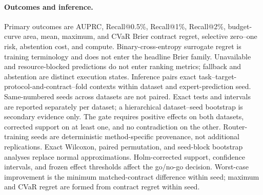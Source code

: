 \paragraph{Outcomes and inference.}
Primary outcomes are AUPRC, Recall@0.5\%, Recall@1\%, Recall@2\%,
budget-curve area, mean, maximum, and CVaR Brier contract regret, selective
zero--one risk, abstention cost, and compute. Binary-cross-entropy surrogate
regret is training terminology and does not enter the headline Brier family.
Unavailable and resource-blocked predictions do not enter
ranking metrics; fallback and abstention are distinct execution states.
Inference pairs exact task--target-protocol-and-contract--fold contexts within
dataset and expert-prediction seed. Same-numbered seeds across datasets are not
paired. Exact tests and intervals are reported separately per dataset; a
hierarchical dataset--seed bootstrap is secondary evidence only. The gate
requires positive effects on both datasets, corrected support on at least one,
and no contradiction on the other. Router-training seeds are deterministic
method-specific provenance, not additional replications. Exact Wilcoxon,
paired permutation, and seed-block bootstrap analyses replace normal
approximations. Holm-corrected support, confidence intervals, and frozen effect
thresholds affect the go/no-go decision. Worst-case improvement is the minimum
matched-contract difference within seed; maximum and CVaR regret are formed
from contract regret within seed.

